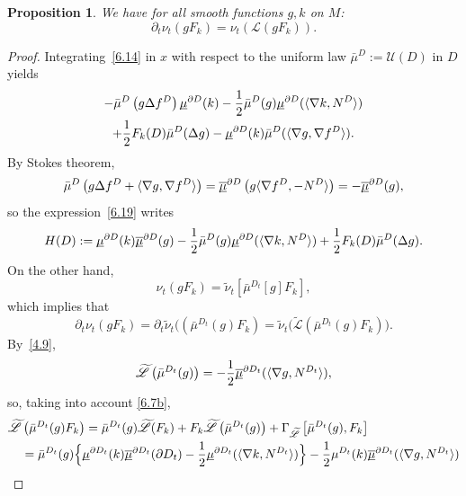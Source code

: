 \documentclass[10pt]{amsart}
\theoremstyle{plain}
\newtheorem{prop}[thm]{Proposition}
\theoremstyle{definition}
\newcommand{\SL}{{\mathscr L}}
\newcommand{\SU}{{\mathscr U}}
\newcommand{\usm}{{\underline{\smash{\mu}}}}
\newcommand{\usbm}{{\underline{\smash{\overline\mu}}}}
\let\f\frac
\let\D\Delta
\let\n\nabla
\let\wi\widetilde
\begin{document}
\begin{prop}
\label{P6.2}
We have for all smooth functions $g,k$ on $M$:
\begin{equation}
\label{6.15.1}
\partial_t\nu_t(gF_k)=\nu_t(\SL (gF_k)).
\end{equation}
\end{prop}
\begin{proof}
Integrating~\eqref{6.14} in $x$ with respect to the uniform law $\bar\mu^D:=\SU(D)$ in $D$ yields
\begin{multline}
\label{6.19}
-\bar\mu^D\left(g\D f^D\right)\usm^{\partial D}(k)-\f12 \bar\mu^D(g)\usm^{\partial D}(\langle \n k,N^D\rangle)\\
+\f12 F_k(D)\bar\mu^D(\D g)-\usm^{\partial D}(k)\bar\mu^D(\langle \n g,\n f^D\rangle ).
\end{multline}
By Stokes theorem,
\begin{equation}
\bar\mu^D\left(g\D f^D+\langle \n g,\n f^D\rangle\right)=\usbm^{\partial D}\left(g\langle \n f^D, -N^D\rangle \right)=-\usbm^{\partial D}(g),
\end{equation}
so the expression~\eqref{6.19} writes
\begin{equation}
H(D):=\usm^{\partial D}(k)\usbm^{\partial D}(g)-\f12\bar\mu^D(g)\usm^{\partial D}(\langle \n k,N^D\rangle )+\f12F_k(D)\bar \mu^D(\D g).
\end{equation}
On the other hand,
\begin{equation}
\nu_t(gF_k)=\wi\nu_t[\bar \mu^{D_t}[g] F_k],
\end{equation}
which implies that
\begin{equation}
\label{6.23}
\partial_t\nu_t(gF_k)=\partial_t\wi\nu_t(\left(\bar \mu^{D_t}(g) F_k\right)=\wi\nu_t\bigl(\wi\SL\left(\bar \mu^{D_t}(g) F_k\right)\bigr).
\end{equation}
By~\eqref{4.9},
\begin{equation}
\wi\SL\left(\bar \mu^{D_t}(g)\right)=-\f12\usbm^{\partial D_t}(\langle \n g,N^{D_t}\rangle),
\end{equation}
so, taking into account \eqref{6.7b},
\begin{align*}
\wi\SL&\left(\bar \mu^{D_t}(g)F_k\right)=\bar \mu^{D_t}(g)\wi \SL(F_k)+F_k\wi\SL\left(\bar \mu^{D_t}(g)\right)+\Gamma_{\wi\SL}\left[\bar \mu^{D_t}(g), F_k\right]\\
&=\bar\mu^{D_t}(g)\Big\{\usm^{\partial D_t}(k)\usbm^{\partial D_t}(\partial D_t)-\f12 \usm^{\partial D_t}(\langle \n k, N^{D_t}\rangle)\Big\}-\f12 \mu^{D_t}(k)\usbm^{\partial D_t}(\langle \n g,N^{D_t}\rangle )\\

\end{align*}
\end{proof}
\end{document}
